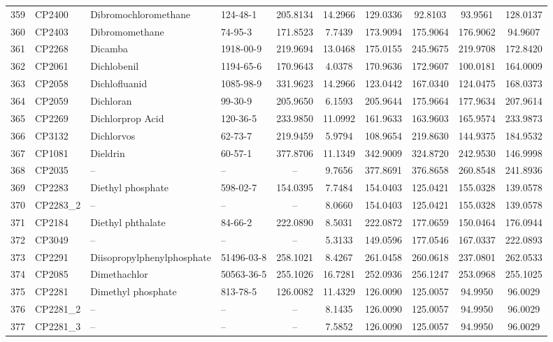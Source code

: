 \begin{longtable}{clllcccccc}
359 & CP2400 & Dibromochloromethane & 124-48-1 & 205.8134 & 14.2966 & 129.0336 & 92.8103 & 93.9561 & 128.0137 \\ 
360 & CP2403 & Dibromomethane & 74-95-3 & 171.8523 & 7.7439 & 173.9094 & 175.9064 & 176.9062 & 94.9607 \\ 
361 & CP2268 & Dicamba & 1918-00-9 & 219.9694 & 13.0468 & 175.0155 & 245.9675 & 219.9708 & 172.8420 \\ 
362 & CP2061 & Dichlobenil & 1194-65-6 & 170.9643 & 4.0378 & 170.9636 & 172.9607 & 100.0181 & 164.0009 \\ 
363 & CP2058 & Dichlofluanid & 1085-98-9 & 331.9623 & 14.2966 & 123.0442 & 167.0340 & 124.0475 & 168.0373 \\ 
364 & CP2059 & Dichloran & 99-30-9 & 205.9650 & 6.1593 & 205.9644 & 175.9664 & 177.9634 & 207.9614 \\ 
365 & CP2269 & Dichlorprop Acid & 120-36-5 & 233.9850 & 11.0992 & 161.9633 & 163.9603 & 165.9574 & 233.9873 \\ 
366 & CP3132 & Dichlorvos & 62-73-7 & 219.9459 & 5.9794 & 108.9654 & 219.8630 & 144.9375 & 184.9532 \\ 
367 & CP1081 & Dieldrin & 60-57-1 & 377.8706 & 11.1349 & 342.9009 & 324.8720 & 242.9530 & 146.9998 \\ 
368 & CP2035 & – & – & – & 9.7656 & 377.8691 & 376.8658 & 260.8548 & 241.8936 \\ 
369 & CP2283 & Diethyl phosphate & 598-02-7 & 154.0395 & 7.7484 & 154.0403 & 125.0421 & 155.0328 & 139.0578 \\ 
370 & CP2283\_2 & – & – & – & 8.0660 & 154.0403 & 125.0421 & 155.0328 & 139.0578 \\ 
371 & CP2184 & Diethyl phthalate & 84-66-2 & 222.0890 & 8.5031 & 222.0872 & 177.0659 & 150.0464 & 176.0944 \\ 
372 & CP3049 & – & – & – & 5.3133 & 149.0596 & 177.0546 & 167.0337 & 222.0893 \\ 
373 & CP2291 & Diisopropylphenylphosphate & 51496-03-8 & 258.1021 & 8.4267 & 261.0458 & 260.0618 & 237.0801 & 262.0533 \\ 
374 & CP2085 & Dimethachlor & 50563-36-5 & 255.1026 & 16.7281 & 252.0936 & 256.1247 & 253.0968 & 255.1025 \\ 
375 & CP2281 & Dimethyl phosphate & 813-78-5 & 126.0082 & 11.4329 & 126.0090 & 125.0057 & 94.9950 & 96.0029 \\ 
376 & CP2281\_2 & – & – & – & 8.1435 & 126.0090 & 125.0057 & 94.9950 & 96.0029 \\ 
377 & CP2281\_3 & – & – & – & 7.5852 & 126.0090 & 125.0057 & 94.9950 & 96.0029 \\ 

\end{longtable}
